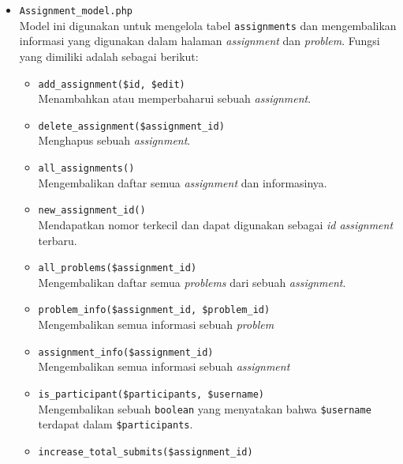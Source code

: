 \documentclass[a4paper,twoside]{article}
\begin{document}
\begin{enumerate}
\begin{itemize}
		            \begin{itemize}
			            \item \verb|Assignment_model.php| \\
			                  Model ini digunakan untuk mengelola tabel \verb|assignments| dan mengembalikan informasi yang digunakan dalam halaman \textit{assignment} dan \textit{problem}. Fungsi yang dimiliki adalah sebagai berikut:

			                  \begin{itemize}
				                  \item \verb|add_assignment($id, $edit)| \\
				                        Menambahkan atau memperbaharui sebuah \textit{assignment}.
				                  \item \verb|delete_assignment($assignment_id)| \\
				                        Menghapus sebuah \textit{assignment}.
				                  \item \verb|all_assignments()| \\
				                        Mengembalikan daftar semua \textit{assignment} dan informasinya.
				                  \item \verb|new_assignment_id()| \\
				                        Mendapatkan nomor terkecil dan dapat digunakan sebagai \textit{id assignment} terbaru.
				                  \item \verb|all_problems($assignment_id)| \\
				                        Mengembalikan daftar semua \textit{problems} dari sebuah \textit{assignment}.
				                  \item \verb|problem_info($assignment_id, $problem_id)| \\
				                        Mengembalikan semua informasi sebuah \textit{problem}
				                  \item \verb|assignment_info($assignment_id)| \\
				                        Mengembalikan semua informasi sebuah \textit{assignment}
				                  \item \verb|is_participant($participants, $username)| \\
				                        Mengembalikan sebuah \verb|boolean| yang menyatakan bahwa \verb|$username| terdapat dalam \verb|$participants|.
				                  \item \verb|increase_total_submits($assignment_id)| \\

\end{itemize}
\end{itemize}
\end{itemize}
\end{enumerate}
\end{document}
